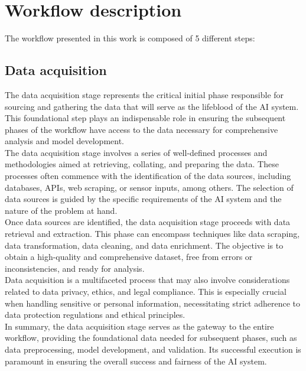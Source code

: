 \documentclass[12pt,a4paper,openright,twoside]{book}
\begin{document}
\section{Workflow description}
The workflow presented in this work is composed of 5 different steps:

\subsection{Data acquisition}
The data acquisition stage represents the critical initial phase responsible for sourcing and gathering the data that will serve as the lifeblood of the AI system. This foundational step plays an indispensable role in ensuring the subsequent phases of the workflow have access to the data necessary for comprehensive analysis and model development. \\
The data acquisition stage involves a series of well-defined processes and methodologies aimed at retrieving, collating, and preparing the data. These processes often commence with the identification of the data sources, including databases, APIs, web scraping, or sensor inputs, among others. The selection of data sources is guided by the specific requirements of the AI system and the nature of the problem at hand. \\
Once data sources are identified, the data acquisition stage proceeds with data retrieval and extraction. This phase can encompass techniques like data scraping, data transformation, data cleaning, and data enrichment. The objective is to obtain a high-quality and comprehensive dataset, free from errors or inconsistencies, and ready for analysis. \\
Data acquisition is a multifaceted process that may also involve considerations related to data privacy, ethics, and legal compliance. This is especially crucial when handling sensitive or personal information, necessitating strict adherence to data protection regulations and ethical principles. \\
In summary, the data acquisition stage serves as the gateway to the entire workflow, providing the foundational data needed for subsequent phases, such as data preprocessing, model development, and validation. Its successful execution is paramount in ensuring the overall success and fairness of the AI system.
\end{document}
